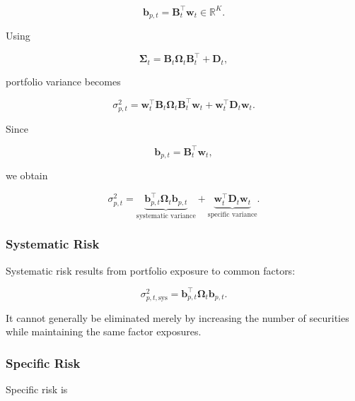 \documentclass[11pt,a4paper]{article}
\begin{document}
\begin{equation}
\boxed{
\mathbf{b}_{p,t}
=
\mathbf{B}_t^\top
\mathbf{w}_t
\in
\mathbb{R}^{K}.
}
\end{equation}

Using

\begin{equation}
\boldsymbol{\Sigma}_t
=
\mathbf{B}_t
\boldsymbol{\Omega}_t
\mathbf{B}_t^\top
+
\mathbf{D}_t,
\end{equation}

portfolio variance becomes

\begin{equation}
\sigma_{p,t}^{2}
=
\mathbf{w}_t^\top
\mathbf{B}_t
\boldsymbol{\Omega}_t
\mathbf{B}_t^\top
\mathbf{w}_t
+
\mathbf{w}_t^\top
\mathbf{D}_t
\mathbf{w}_t.
\end{equation}

Since

\begin{equation}
\mathbf{b}_{p,t}
=
\mathbf{B}_t^\top\mathbf{w}_t,
\end{equation}

we obtain

\begin{equation}
\boxed{
\sigma_{p,t}^{2}
=
\underbrace{
\mathbf{b}_{p,t}^{\top}
\boldsymbol{\Omega}_t
\mathbf{b}_{p,t}
}_{\text{systematic variance}}
+
\underbrace{
\mathbf{w}_t^\top
\mathbf{D}_t
\mathbf{w}_t
}_{\text{specific variance}}.
}
\end{equation}


\subsubsection{Systematic Risk}

Systematic risk results from portfolio exposure to common factors:

\begin{equation}
\boxed{
\sigma_{p,t,\mathrm{sys}}^{2}
=
\mathbf{b}_{p,t}^{\top}
\boldsymbol{\Omega}_t
\mathbf{b}_{p,t}.
}
\end{equation}

It cannot generally be eliminated merely by increasing the number of securities
while maintaining the same factor exposures.


\subsubsection{Specific Risk}

Specific risk is
\end{document}
